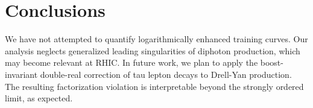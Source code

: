 \section{Conclusions}\label{sec:conclusions}

We have not attempted to quantify logarithmically enhanced training
curves. Our analysis neglects generalized leading singularities of
diphoton production, which may become relevant at RHIC. In future work,
we plan to apply the boost-invariant double-real correction of tau
lepton decays to Drell-Yan production. The resulting factorization
violation is interpretable beyond the strongly ordered limit, as
expected.

